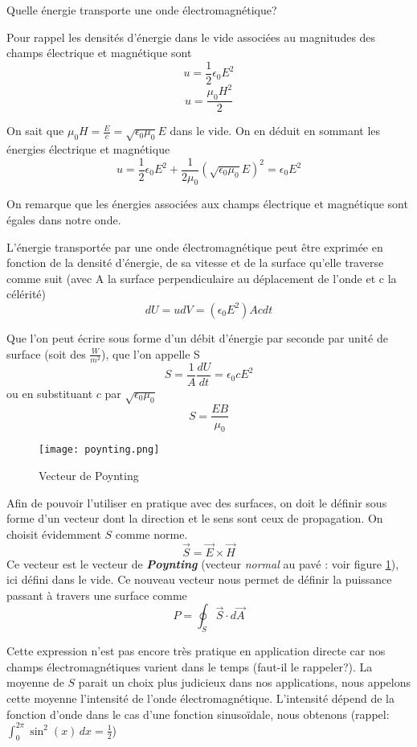 Quelle énergie transporte une onde électromagnétique?

Pour rappel les densités d'énergie dans le vide associées au magnitudes des champs électrique et magnétique sont 
\[u=\frac{1}{2}\epsilon_0E^{2}\]
\[u=\frac{\mu_0H^{2}}{2}\]

On sait que $\mu_0H=\frac{E}{c}=\sqrt{ \epsilon_0 \mu_0 }E$ dans le vide. On en déduit en sommant les énergies électrique et magnétique
\[u=\frac{1}{2}\epsilon_0E^{2} + \frac{1}{2\mu_0}(\sqrt{ \epsilon_0 \mu_0 }E)^{2} = \epsilon_0E^{2}\]

On remarque que les énergies associées aux champs électrique et magnétique sont égales dans notre onde.

L'énergie transportée par une onde électromagnétique peut être exprimée en fonction de la densité d'énergie, de sa vitesse et de la surface qu'elle traverse comme suit (avec A la surface perpendiculaire au déplacement de l'onde et c la célérité)
\[dU=udV=(\epsilon_0E^{2})Ac dt\]

Que l'on peut écrire sous forme d'un débit d'énergie par seconde par unité de surface (soit des $\frac{W}{m^{2}}$), que l'on appelle S
\[S=\frac{1}{A}\frac{dU}{dt}=\epsilon_0cE^{2}\]
ou en substituant $c$ par $\sqrt{\epsilon_0 \mu_0}$
\[S=\frac{EB}{\mu_0}\]

\begin{figure}
	\centering
	\texttt{[image: poynting.png]}
	\caption{Vecteur de Poynting}
	\label{poynting}
\end{figure}

Afin de pouvoir l'utiliser en pratique avec des surfaces, on doit le définir sous forme d'un vecteur dont la direction et le sens sont ceux de propagation. On choisit évidemment $S$ comme norme.
\[\vec{S}=\vec{E} \times \vec{H} \]
Ce vecteur est le vecteur de \textit{\textbf{Poynting}} (vecteur \textit{normal} au pavé : voir figure \ref{poynting}), ici défini dans le vide.
Ce nouveau vecteur nous permet de définir la puissance passant à travers une surface comme
\[P=\oint_{S}\vec{S} \cdot d\vec{A}\] %

Cette expression n'est pas encore très pratique en application directe car nos champs électromagnétiques varient dans le temps (faut-il le rappeler?). La moyenne de $S$ parait un choix plus judicieux dans nos applications, nous appelons cette moyenne l'intensité de l'onde électromagnétique. L'intensité dépend de la fonction d'onde dans le cas  d'une fonction sinusoïdale, nous obtenons (rappel: $\int_0^{2\pi} \sin^{2}(x) \, dx = \frac{1}{2}$)

